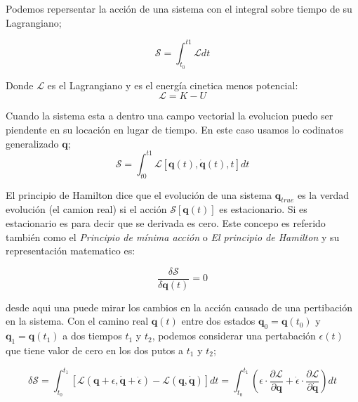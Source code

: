 \documentclass[11pt]{article}
\begin{document}
	Podemos repersentar la acci\'on de una sistema con el integral sobre tiempo de su Lagrangiano;
	
\begin{equation}
	\mathcal {S}=\int_{t_0}^{t1} \mathcal{L} dt
\end{equation} 

Donde $\mathcal{L}$ es el Lagrangiano y es el energ\'ia cinetica menos potencial:
\begin{equation}
	\mathcal{L}=K-U
\end{equation}
	

Cuando la sistema esta a dentro una campo vectorial la evolucion puedo ser piendente en su locaci\'on en lugar de tiempo. En este caso usamos lo codinatos generalizado $\boldsymbol q$;
\begin{equation}
		\mathcal{S}=\int_{t0}^{t1} \mathcal{L} [\boldsymbol q (t),\dot {\boldsymbol q }(t), t] dt
\end{equation}

El principio de Hamilton dice que el evoluci\'on de una sistema $\boldsymbol q_{true}$ es la verdad evoluci\'on (el camion real) si el acci\'on $\mathcal{S}[\boldsymbol{q} (t)]$ es estacionario. Si es estacionario es para decir que se derivada es cero. Este concepo es referido tambi\'en como el \emph{Principio de mínima acción} o \emph{El principio de Hamilton} y su representaci\'on matematico es:

\begin{equation}
	\frac{\delta \mathcal S }{\delta \boldsymbol q(t)}=0
\end{equation}
 
 desde aqui una puede mirar los cambios en la acci\'on causado de una pertibaci\'on en la sistema. Con el camino real $\boldsymbol q (t)$ entre dos estados $\boldsymbol q_0=\boldsymbol q(t_0)$ y $\boldsymbol q_1=\boldsymbol q(t_1)$  a dos tiempos $t_1$ y $t_2$, podemos considerar una pertabaci\'on $\epsilon(t)$ que tiene valor de cero en los dos putos a $t_1$ y $t_2$;
 
\begin{equation}
 \delta \mathcal{S}=
 \int_{t_0}^{t_1} \left [  
 	\mathcal{L} \left ( 
 		\boldsymbol{q}+\epsilon , \dot{\boldsymbol{q}} + \dot{\epsilon} 
 	\right ) -  \mathcal{L} \left ( 
 		\boldsymbol{ q}, \dot{\boldsymbol{q}} 
 	\right )  
 \right ]dt=
 \int_{t_0}^{t_1} \left ( 
 	\epsilon \cdot \frac { \partial   \mathcal{L}} {\partial \boldsymbol{q} }+ \dot{\epsilon}\cdot \frac {\partial  \mathcal{L} } {\partial \dot{\boldsymbol{q}}} \right )dt
\end{equation}
\end{document}

